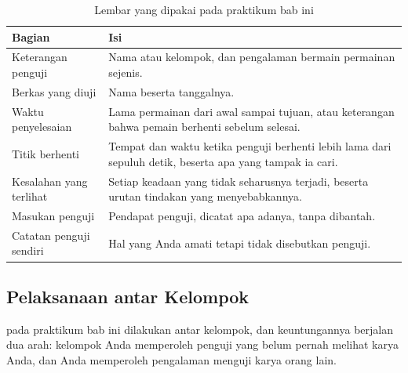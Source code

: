 \begin{table}[htbp]
\centering
\caption{Lembar  yang dipakai pada praktikum bab ini}
\label{tab:lembar-playtest}
{\setlength{\tabcolsep}{4pt}\footnotesize%
\begin{tabularx}{\textwidth}{@{}L{4.2cm} Y@{}}
\toprule
\headrow \textbf{Bagian} & \textbf{Isi} \\
\midrule
Keterangan penguji & Nama atau kelompok, dan pengalaman bermain permainan
sejenis. \\
\addlinespace
Berkas yang diuji & Nama  beserta tanggalnya. \\
\addlinespace
Waktu penyelesaian & Lama permainan dari awal sampai tujuan, atau keterangan
bahwa pemain berhenti sebelum selesai. \\
\addlinespace
Titik berhenti & Tempat dan waktu ketika penguji berhenti lebih lama dari
sepuluh detik, beserta apa yang tampak ia cari. \\
\addlinespace
Kesalahan yang terlihat & Setiap keadaan yang tidak seharusnya terjadi,
beserta urutan tindakan yang menyebabkannya. \\
\addlinespace
Masukan penguji & Pendapat penguji, dicatat apa adanya, tanpa dibantah. \\
\addlinespace
Catatan penguji sendiri & Hal yang Anda amati tetapi tidak disebutkan
penguji. \\
\bottomrule
\end{tabularx}}
\end{table}

\subsection{Pelaksanaan  antar Kelompok}

 pada praktikum bab ini dilakukan antar kelompok, dan
keuntungannya berjalan dua arah: kelompok Anda memperoleh penguji yang belum
pernah melihat karya Anda, dan Anda memperoleh pengalaman menguji karya orang
lain.

